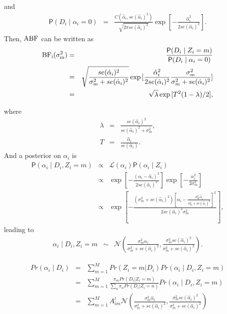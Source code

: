 \documentclass[12pt,letterpaper]{article}
\renewcommand{\Pr}{\mathsf{P}}
\newcommand{\given}{\mid}
\newcommand{\Normal}{\mathcal{N}}
\newcommand{\like}{\mathcal{L}}
\def\BF{\rm BF}
\def\ABF{\rm ABF}
\newcommand{\zuk}[1]{\textcolor{red}{[#1 --Or]}}
\newcommand{\heejung}[1]{\textcolor{blue}{[#1 --Heejung]}}
\begin{document}
and
\begin{eqnarray}
\Pr(D_i \given \alpha_i = 0) &=& \frac{C(\hat{\alpha}_i, se(\hat{\alpha}_i)^2)}{\sqrt {2\pi se(\hat{\alpha}_i)^2 } }\exp{[-\frac{\hat{\alpha}_i^2}{2se(\hat{\alpha}_i)^2}]}.
\end{eqnarray}
Then, $\ABF$ can be written as
\begin{eqnarray}
\BF_i(\sigma^2_m) &=&  \frac{\Pr(D_i \given Z_i = m)}{\Pr(D_i \given \alpha_i = 0)}\\
			       &=&  \sqrt{\frac{se(\hat{\alpha}_i)^2}{\sigma^2_m + se(\hat{\alpha}_i)^2}}  \exp{[\frac{\hat{\alpha}_i^2}{2se(\hat{\alpha}_i)^2} \frac{\sigma^2_m}{\sigma^2_m + se(\hat{\alpha}_i)^2}]}\\
			       &=& \sqrt{\lambda} \exp{[T^2 (1-\lambda)/2]},
\end{eqnarray}

where
\begin{eqnarray}
\lambda &=& \frac{se(\hat{\alpha}_i)^2}{se(\hat{\alpha}_i)^2 + \sigma^2_m} ,\\
T &=&  \frac{\hat{\alpha}_i}{se(\hat{\alpha}_i)}.
\end{eqnarray}
And a posterior on $\alpha_i$ is
\begin{eqnarray}
\Pr(\alpha_i \given D_i, Z_i = m) &\propto& \like(\alpha_i)\Pr(\alpha_i \given Z_i)\\
					   &\propto&  \exp{[-\frac{\left(\alpha_i -  \hat{\alpha}_i\right)^2}{2se(\hat{\alpha}_i)^2}]} \exp{[-\frac{\alpha_i^2}{2\sigma^2_m}]}\\
					   &\propto&  \exp{[-\frac{\left(\sigma^2_m + se(\hat{\alpha}_i)^2\right)[\alpha_i- \frac{\sigma^2_m \hat{\alpha}_i}{\sigma^2_m + se(\hat{\alpha}_i)^2}]^2}{2se(\hat{\alpha}_i)^2\sigma^2_m}]},
\end{eqnarray}
leading to
\begin{eqnarray}
\alpha_i \given D_i, Z_i = m &\sim& \Normal(\frac{\sigma^2_m \hat{\alpha}_i}{\sigma^2_m + se(\hat{\alpha}_i)^2}, \frac{\sigma^2_mse(\hat{\alpha}_i)^2}{\sigma^2_m + se(\hat{\alpha}_i)^2}).
\end{eqnarray}

\begin{eqnarray}
Pr(\alpha_i \given D_i) &=& \sum_{m=1}^M Pr(Z_i = m | D_i) Pr(\alpha_i \given D_i, Z_i = m) \\
&=& \sum_{m=1}^M \frac{\pi_m Pr(D_i | Z_i=m)}{\sum_n \pi_n Pr(D_i | Z_i=n)} Pr(\alpha_i \given D_i, Z_i = m) \\
&=& \sum_{m=1}^M A_{im}^l \Normal(\frac{\sigma^2_m \hat{\alpha}_i}{\sigma^2_m + se(\hat{\alpha}_i)^2}, \frac{\sigma^2_mse(\hat{\alpha}_i)^2}{\sigma^2_m + se(\hat{\alpha}_i)^2})
\end{eqnarray}
\end{document}
